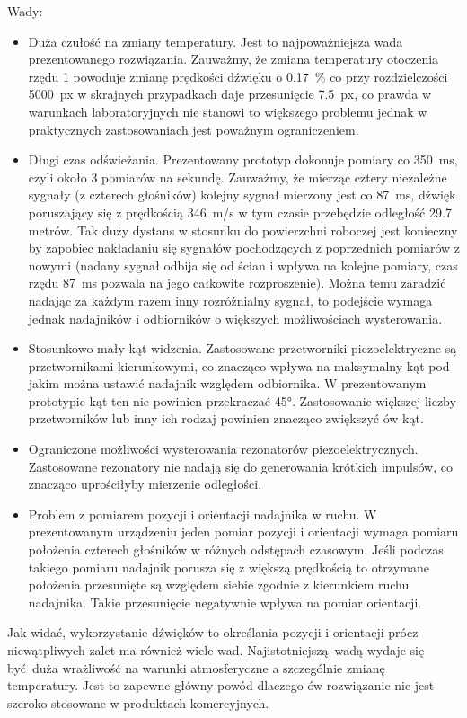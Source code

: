 Wady:
\begin{itemize}
 \item Duża czułość na zmiany temperatury. Jest to najpoważniejsza wada prezentowanego rozwiązania.
 Zauważmy, że zmiana temperatury otoczenia rzędu \SI{1}{\degC} powoduje zmianę prędkości dźwięku o \SI{0,17}{\%} 
 co przy rozdzielczości \SI{5000}{px} w skrajnych przypadkach daje przesunięcie \SI{7.5}{px},
 co prawda w warunkach laboratoryjnych nie stanowi to większego problemu jednak w praktycznych zastosowaniach
 jest poważnym ograniczeniem.
 
 \item Długi czas odświeżania. Prezentowany prototyp dokonuje pomiary co \SI{350}{ms}, czyli około 3 pomiarów 
 na sekundę. Zauważmy, że mierząc cztery niezależne sygnały (z czterech głośników) kolejny sygnał mierzony jest co \SI{87}{ms},
  dźwięk poruszający się z prędkością \SI{346}{m/s} w tym czasie przebędzie odległość 29.7 metrów.
 Tak duży dystans w stosunku do powierzchni roboczej jest konieczny by zapobiec nakładaniu się sygnałów pochodzących z poprzednich
 pomiarów z nowymi (nadany sygnał odbija się od ścian i wpływa na kolejne pomiary, czas rzędu \SI{87}{ms} pozwala 
 na jego całkowite rozproszenie).
 Można temu zaradzić nadając za każdym razem inny rozróżnialny sygnał, to podejście 
 wymaga jednak nadajników i odbiorników o większych możliwościach wysterowania.
 
 \item Stosunkowo mały kąt widzenia. Zastosowane przetworniki piezoelektryczne są przetwornikami kierunkowymi, co 
 znacząco wpływa na maksymalny kąt pod jakim można ustawić nadajnik względem odbiornika. W prezentowanym 
 prototypie kąt ten nie powinien przekraczać \ang{45}. Zastosowanie większej liczby przetworników lub inny ich rodzaj
 powinien znacząco zwiększyć ów kąt.

 \item Ograniczone możliwości wysterowania rezonatorów piezoelektrycznych. 
 Zastosowane rezonatory nie nadają się do generowania krótkich impulsów, co znacząco uprościłyby mierzenie odległości.
 
 \item Problem z pomiarem pozycji i orientacji nadajnika w ruchu. W prezentowanym urządzeniu 
 jeden pomiar pozycji i orientacji wymaga pomiaru położenia czterech głośników w różnych odstępach czasowym.
 Jeśli podczas takiego pomiaru nadajnik porusza się z większą prędkością to otrzymane położenia
 przesunięte są względem siebie zgodnie z kierunkiem ruchu nadajnika. Takie przesunięcie negatywnie wpływa na 
 pomiar orientacji. 
\end{itemize}


Jak widać, wykorzystanie dźwięków to określania pozycji i orientacji prócz niewątpliwych zalet ma również
wiele wad. Najistotniejszą wadą wydaje się być duża wrażliwość na warunki atmosferyczne a szczególnie zmianę temperatury.
Jest to zapewne główny powód dlaczego ów rozwiązanie nie jest szeroko stosowane w produktach komercyjnych.




